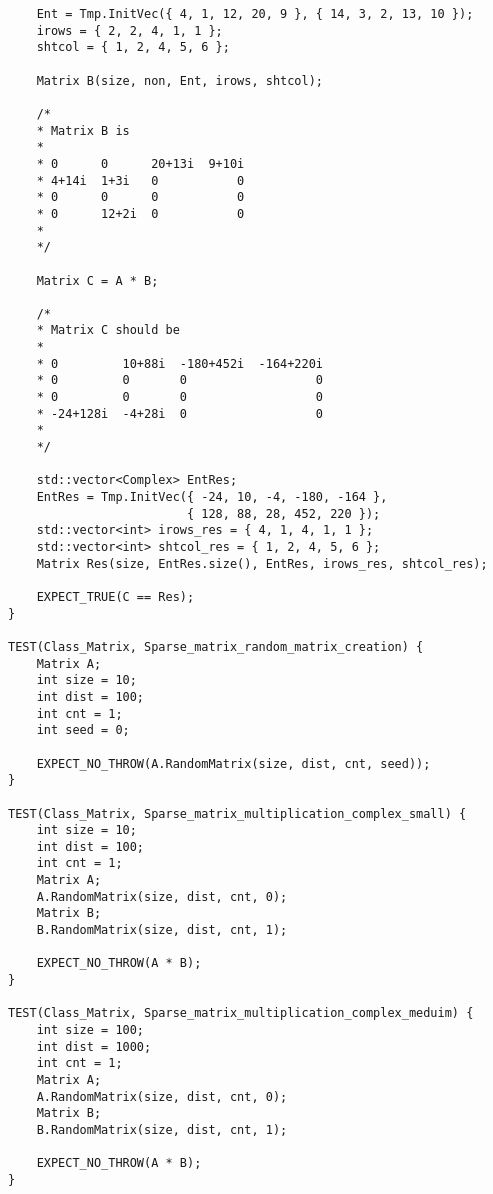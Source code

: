 \documentclass[12pt]{report}
\begin{document}
\begin{lstlisting}
    Ent = Tmp.InitVec({ 4, 1, 12, 20, 9 }, { 14, 3, 2, 13, 10 });
    irows = { 2, 2, 4, 1, 1 };
    shtcol = { 1, 2, 4, 5, 6 };

    Matrix B(size, non, Ent, irows, shtcol);

    /*
    * Matrix B is
    *
    * 0      0      20+13i  9+10i
    * 4+14i  1+3i   0           0
    * 0      0      0           0
    * 0      12+2i  0           0
    *
    */

    Matrix C = A * B;

    /*
    * Matrix C should be
    *
    * 0         10+88i  -180+452i  -164+220i
    * 0         0       0                  0
    * 0         0       0                  0
    * -24+128i  -4+28i  0                  0
    *
    */

    std::vector<Complex> EntRes;
    EntRes = Tmp.InitVec({ -24, 10, -4, -180, -164 },
                         { 128, 88, 28, 452, 220 });
    std::vector<int> irows_res = { 4, 1, 4, 1, 1 };
    std::vector<int> shtcol_res = { 1, 2, 4, 5, 6 };
    Matrix Res(size, EntRes.size(), EntRes, irows_res, shtcol_res);

    EXPECT_TRUE(C == Res);
}

TEST(Class_Matrix, Sparse_matrix_random_matrix_creation) {
    Matrix A;
    int size = 10;
    int dist = 100;
    int cnt = 1;
    int seed = 0;

    EXPECT_NO_THROW(A.RandomMatrix(size, dist, cnt, seed));
}

TEST(Class_Matrix, Sparse_matrix_multiplication_complex_small) {
    int size = 10;
    int dist = 100;
    int cnt = 1;
    Matrix A;
    A.RandomMatrix(size, dist, cnt, 0);
    Matrix B;
    B.RandomMatrix(size, dist, cnt, 1);

    EXPECT_NO_THROW(A * B);
}

TEST(Class_Matrix, Sparse_matrix_multiplication_complex_meduim) {
    int size = 100;
    int dist = 1000;
    int cnt = 1;
    Matrix A;
    A.RandomMatrix(size, dist, cnt, 0);
    Matrix B;
    B.RandomMatrix(size, dist, cnt, 1);

    EXPECT_NO_THROW(A * B);
}

\end{lstlisting}
\end{document}
